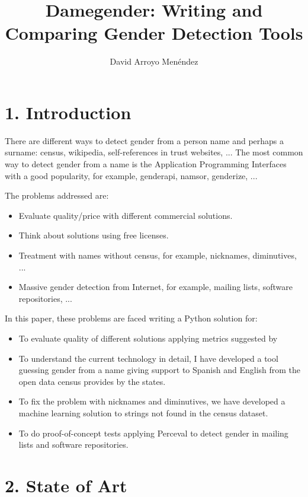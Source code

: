 \documentclass[fleqn,10pt]{wlpeerj} %
\title{Damegender: Writing and Comparing Gender Detection Tools}
\author[1]{David Arroyo Menéndez}
\affil[1]{Universidad Rey Juan Carlos}
\begin{document}
\flushbottom
\maketitle
\thispagestyle{empty}

\section*{1. Introduction}

There are different ways to detect gender from a person name and
perhaps a surname: census, wikipedia, self-references in trust
websites, ... The most common way to detect gender from a name is the
Application Programming Interfaces with a good popularity, for
example, genderapi, namsor, genderize, ...
~\cite{10.7717/peerj-cs.156}

The problems addressed are:
\begin{itemize}[noitemsep]
\item Evaluate quality/price with different commercial solutions.
\item Think about solutions using free licenses.
\item Treatment with names without census, for example, nicknames,
  diminutives, ...
\item Massive gender detection from Internet, for example, mailing
  lists, software repositories, ...
\end{itemize}

In this paper, these problems are faced writing a Python solution for:
\begin{itemize}[noitemsep]
\item To evaluate quality of different solutions applying metrics
  suggested by ~\cite{10.7717/peerj-cs.156}
\item To understand the current technology in detail, I have developed
  a tool guessing gender from a name giving support to Spanish and
  English from the open data census provides by the states.
\item To fix the problem with nicknames and diminutives, we have
  developed a machine learning solution to strings not found in the
  census dataset.
\item To do proof-of-concept tests applying Perceval to detect
  gender in mailing lists and software repositories.
\end{itemize}

\section*{2. State of Art}
\end{document}
